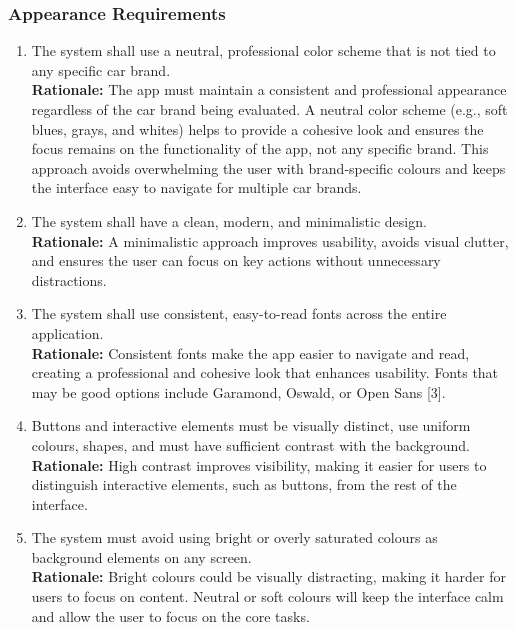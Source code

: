 \documentclass[]{article}
\begin{document}
\subsubsection{Appearance Requirements}
\label{ssub:appearance_requirements}
\begin{enumerate}[{LF-A}1.]
    \item The system shall use a neutral, professional color scheme that is not tied to any specific car brand. \\
    \textbf{Rationale:} The app must maintain a consistent and professional appearance regardless of the car brand being evaluated. A neutral color scheme (e.g., soft blues, grays, and whites) helps to provide a cohesive look and ensures the focus remains on the functionality of the app, not any specific brand. This approach avoids overwhelming the user with brand-specific colours and keeps the interface easy to navigate for multiple car brands.
    
    \item The system shall have a clean, modern, and minimalistic design.  \\
    \textbf{Rationale:} A minimalistic approach improves usability, avoids visual clutter, and ensures the user can focus on key actions without unnecessary distractions.

    \item The system shall use consistent, easy-to-read fonts across the entire application. \\ 
    \textbf{Rationale:} Consistent fonts make the app easier to navigate and read, creating a professional and cohesive look that enhances usability. Fonts that may be good options include Garamond, Oswald, or Open Sans [3].

    \item  Buttons and interactive elements must be visually distinct, use uniform colours, shapes, and must have sufficient contrast with the background. \\ 
    \textbf{Rationale:} High contrast improves visibility, making it easier for users to distinguish interactive elements, such as buttons, from the rest of the interface.

    \item The system must avoid using bright or overly saturated colours as background elements on any screen.  \\
    \textbf{Rationale:} Bright colours could be visually distracting, making it harder for users to focus on content. Neutral or soft colours will keep the interface calm and allow the user to focus on the core tasks.
\end{enumerate}
\end{document}
